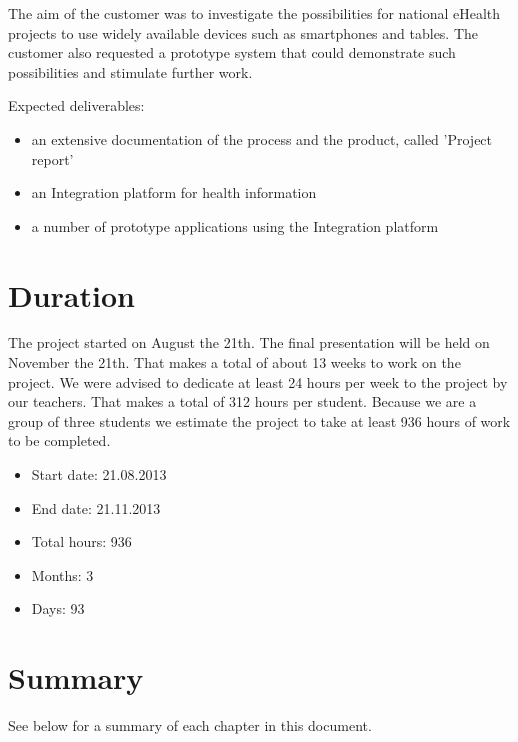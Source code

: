 The aim of the customer was to investigate the possibilities for national eHealth projects to use widely available
devices such as smartphones and tables. The customer also requested a prototype system that could demonstrate such
possibilities and stimulate further work.

Expected deliverables:
\begin{itemize}
\item an extensive documentation of the process and the product, called 'Project report'
\item an Integration platform for health information
\item a number of prototype applications using the Integration platform
\end{itemize}

\section{Duration}
\label{section:duration}
The project started on August the 21th. The final presentation will be held on November the 21th.
That makes a total of about 13 weeks to work on the project.
We were advised to dedicate at least 24 hours per week to the project by our teachers.
That makes a total of 312 hours per student. Because we are a group of three students we estimate
the project to take at least 936 hours of work to be completed.

\begin{itemize}
\item Start date: 21.08.2013
\item End date: 21.11.2013
\item Total hours: 936
\item Months: 3
\item Days: 93
\end{itemize}

\section{Summary}

See below for a summary of each chapter in this document.

